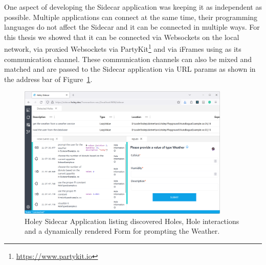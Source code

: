 One aspect of developing the Sidecar application was keeping it as independent as possible.
Multiple applications can connect at the same time, their programming languages do not affect the Sidecar and it can be connected in multiple ways.
For this thesis we showed that it can be connected via Websockets on the local network, via proxied Websockets via PartyKit\footnote{\url{https://www.partykit.io}} and via iFrames using \texttt{} as its communication channel.
These communication channels can also be mixed and matched and are passed to the Sidecar application via URL params as shown in the address bar of Figure~\ref{fig:holey-sidecar}.

\begin{figure}[ht]
    \centering
    \includegraphics[width=0.9\textwidth]{images/sidecar}
    \caption{Holey Sidecar Application listing discovered Holes, Hole interactions and a dynamically rendered Form for prompting the Weather.}
    \label{fig:holey-sidecar}
\end{figure}
